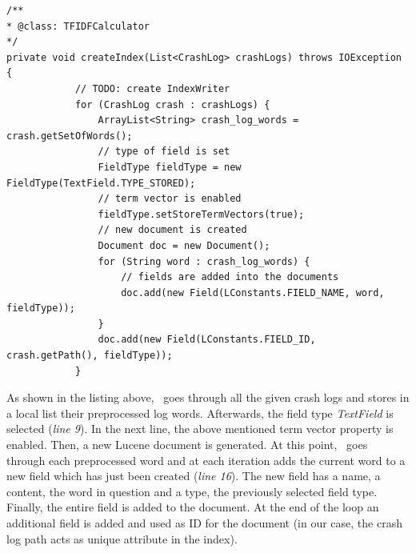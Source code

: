 \begin{lstlisting}[caption=\TFIDF\ describing the Lucene indexing process,label={lst: indexing}]
/**
* @class: TFIDFCalculator
*/
private void createIndex(List<CrashLog> crashLogs) throws IOException {
			// TODO: create IndexWriter
            for (CrashLog crash : crashLogs) {
                ArrayList<String> crash_log_words = crash.getSetOfWords();
                // type of field is set
                FieldType fieldType = new FieldType(TextField.TYPE_STORED); 
                // term vector is enabled
                fieldType.setStoreTermVectors(true); 
                // new document is created
                Document doc = new Document(); 
                for (String word : crash_log_words) {
                    // fields are added into the documents
                    doc.add(new Field(LConstants.FIELD_NAME, word, fieldType)); 
                }
                doc.add(new Field(LConstants.FIELD_ID, crash.getPath(), fieldType));
            }
\end{lstlisting} 
As shown in the listing above, \toolname\ goes through all the given crash logs and stores in a local list their preprocessed log words. 
Afterwards, the field type \textit{TextField} is selected (\textit{line 9}). 
In the next line, the above mentioned term vector property is enabled. 
Then, a new Lucene document is generated. 
At this point, \toolname\ goes through each preprocessed word and at each iteration adds the current word to a new field which has just been created (\textit{line 16}). 
The new field has a name, a content, \ie the word in question and a type, \ie the previously selected field type. 
Finally, the entire field is added to the document. 
At the end of the loop an additional field is added and used as ID for the document (in our case, the crash log path acts as unique attribute in the index). 

